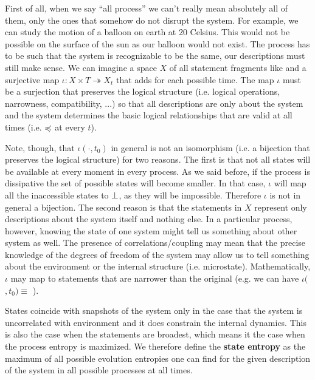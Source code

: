 \documentclass[letterpaper]{article}
\begin{document}
First of all, when we say ``all process'' we can't really mean absolutely all of them, only the ones that somehow do not disrupt the system. For example, we can study the motion of a balloon on earth at 20 Celsius. This would not be possible on the surface of the sun as our balloon would not exist. The process has to be such that the system is recognizable to be the same, our descriptions must still make sense. We can imagine a space $X$ of all statement fragments like  and a surjective map $\iota : X \times T \twoheadrightarrow X_t$ that adds  for each possible time. The map $\iota$ must be a surjection that preserves the logical structure (i.e. logical operations, narrowness, compatibility, ...) so that all descriptions are only about the system and the system determines the basic logical relationships that are valid at all times (i.e.  $\preccurlyeq$  at every $t$).

Note, though, that $\iota( \cdot, t_0)$ in general is not an isomorphism (i.e. a bijection that preserves the logical structure) for two reasons. The first is that not all states will be available at every moment in every process. As we said before, if the process is dissipative the set of possible states will become smaller. In that case, $\iota$ will map all the inaccessible states to $\bot$, as they will be impossible. Therefore $\iota$ is not in general a bijection. The second reason is that the statements in $X$ represent only descriptions about the system itself and nothing else. In a particular process, however, knowing the state of one system might tell us something about other system as well. The presence of correlations/coupling may mean that the precise knowledge of the degrees of freedom of the system may allow us to tell something about the environment or the internal structure (i.e. microstate). Mathematically, $\iota$ may map to statements that are narrower than the original (e.g. we can have $\iota($$, t_0) \equiv$ ).

States coincide with snapshots of the system only in the case that the system is uncorrelated with environment and it does constrain the internal dynamics. This is also the case when the statements are broadest, which means it the case when the process entropy is maximized. We therefore define the \textbf{state entropy} as the maximum of all possible evolution entropies one can find for the given description of the system in all possible processes at all times.
\end{document}
